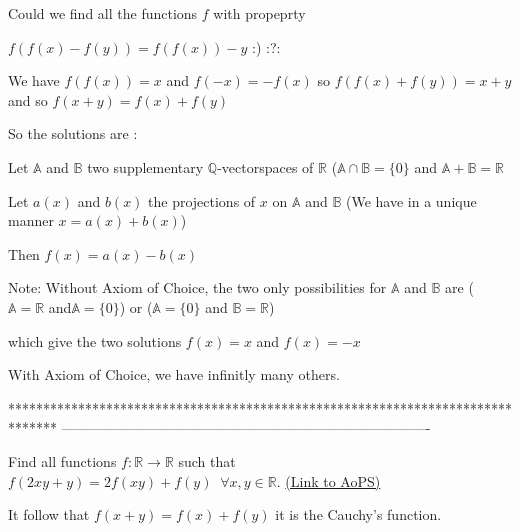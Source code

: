 \begin{mysolution}
	\begin{tcolorbox}Could we find all the functions 
 $ f$ with propeprty 

  $ f(f(x) - f(y)) = f(f(x)) - y$    :)  :?:\end{tcolorbox}

We have $ f(f(x))=x$ and $ f(-x)=-f(x)$ so $ f(f(x)+f(y))=x+y$ and so $ f(x+y)=f(x)+f(y)$

So the solutions are :

Let $ \mathbb{A}$ and $ \mathbb{B}$ two supplementary $ \mathbb{Q}$-vectorspaces of $ \mathbb{R}$ ($ \mathbb{A}\cap\mathbb{B}=\{0\}$ and $ \mathbb{A}+\mathbb{B}=\mathbb{R}$

Let $ a(x)$ and $ b(x)$ the projections of $ x$ on $ \mathbb{A}$ and $ \mathbb{B}$  (We have in a unique manner $ x=a(x)+b(x)$)

Then $ f(x)=a(x)-b(x)$ 

Note:
Without Axiom of Choice, the two only possibilities for $ \mathbb{A}$ and $ \mathbb{B}$ are ( $ \mathbb{A}=\mathbb{R}$ and$ \mathbb{A}=\{0\}$) or ($ \mathbb{A}=\{0\}$ and $ \mathbb{B}=\mathbb{R}$)

which give the two solutions $ f(x)=x$ and $ f(x)=-x$

With Axiom of Choice, we have infinitly many others.
\end{mysolution}
*******************************************************************************
-------------------------------------------------------------------------------

\begin{problem}
	Find all functions $ f: \mathbb{R}\to\mathbb{R}$ such that $ f(2xy+y)=2f(xy)+f(y)\;\;\forall x,y\in\mathbb{R}.$
	\flushright \href{https://artofproblemsolving.com/community/c6h177135}{(Link to AoPS)}
\end{problem}



\begin{mysolution}
	It follow that 
$ f(x+y)=f(x)+f(y)$ it is the Cauchy's  function.
\end{mysolution}



